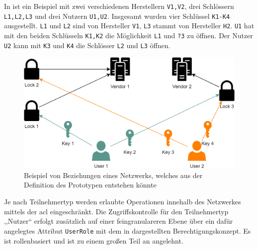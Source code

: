         \noindent In  ist ein Beispiel mit zwei verschiedenen Herstellern \colorbox{light-gray}{\lstinline{V1,V2}}, drei Schlössern \colorbox{light-gray}{\lstinline{L1,L2,L3}} und drei Nutzern \colorbox{light-gray}{\lstinline{U1,U2}}. 
        Insgesamt wurden vier Schlüssel \colorbox{light-gray}{\lstinline{K1-K4}} ausgestellt.
        \colorbox{light-gray}{\lstinline{L1}} und \colorbox{light-gray}{\lstinline{L2}} sind von Hersteller \colorbox{light-gray}{\lstinline{V1}}, \colorbox{light-gray}{\lstinline{L3}} stammt von Hersteller \colorbox{light-gray}{\lstinline{H2}}. 
        \colorbox{light-gray}{\lstinline{U1}} hat mit den beiden Schlüsseln \colorbox{light-gray}{\lstinline{K1,K2}} die Möglichkeit \colorbox{light-gray}{\lstinline{L1}} und \colorbox{light-gray}{\lstinline{?3}} zu öffnen. 
        Der Nutzer \colorbox{light-gray}{\lstinline{U2}} kann mit \colorbox{light-gray}{\lstinline{K3}} und \colorbox{light-gray}{\lstinline{K4}} die Schlösser \colorbox{light-gray}{\lstinline{L2}} und \colorbox{light-gray}{\lstinline{L3}} öffnen.
        \begin{figure}[H]
    		\centering
    		\includegraphics[width=\textwidth]{graphics/pt_network.png}
    		\caption[Beispiel eines von Beziehungen im Prototypen-Netzwerk]{Beispiel von Beziehungen eines Netzwerks, welches aus der Definition des Prototypen entstehen könnte}
    		\label{fig:pt_network}
    	\end{figure}
        \noindent Je nach Teilnehmertyp werden erlaubte Operationen innehalb des Netzwerkes mittels der \gls{acl} eingeschränkt. 
        Die Zugriffskontrolle für den Teilnehmertyp ,,Nutzer`` erfolgt zusätzlich auf einer feingranulareren Ebene über ein dafür angelegtes Attribut \colorbox{light-gray}{\lstinline{UserRole}} mit dem in  dargestellten Berechtigungskonzept. 
        Es ist rollenbasiert und ist zu einem großen Teil an  angelehnt. 
